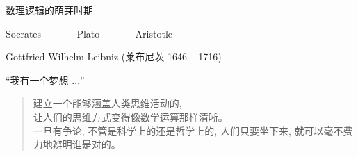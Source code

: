 
\begin{frame}{}
\end{frame}

\begin{frame}{}
  \begin{center}
    数理逻辑的萌芽时期

    Socrates $\qquad\quad$ Plato $\qquad\quad$ Aristotle
  \end{center}
\end{frame}

\begin{frame}{}
\end{frame}

\begin{frame}{}

  \pause
  \begin{center}
    Gottfried Wilhelm Leibniz (莱布尼茨 1646 -- 1716)
  \end{center}
\end{frame}

\begin{frame}{``我有一个梦想 $\ldots$''}
  \begin{quote}
    建立一个能够涵盖人类思维活动的,\\
    让人们的思维方式变得像数学运算那样清晰。\\[8pt]

    一旦有争论, 不管是科学上的还是哲学上的,
    人们只要坐下来,
    就可以毫不费力地辨明谁是对的。
  \end{quote}

  \vspace{0.80cm}
  \begin{quote}
    \centerline{}
  \end{quote}
\end{frame}

\begin{frame}{}
\end{frame}
